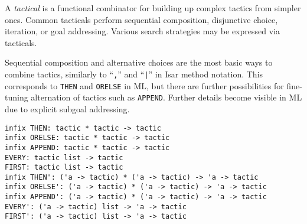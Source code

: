 \begin{isabellebody}
\begin{isamarkuptext}
\begin{description}
  \end{description}%
\end{isamarkuptext}%
\isamarkuptrue%
%
\endisatagmlref
{\isafoldmlref}%
%
\isadelimmlref
%
\endisadelimmlref
%
\isamarkuptrue%
%
\begin{isamarkuptext}%
A \emph{tactical} is a functional combinator for building up
  complex tactics from simpler ones.  Common tacticals perform
  sequential composition, disjunctive choice, iteration, or goal
  addressing.  Various search strategies may be expressed via
  tacticals.%
\end{isamarkuptext}%
\isamarkuptrue%
%
\isamarkuptrue%
%
\begin{isamarkuptext}%
Sequential composition and alternative choices are the most
  basic ways to combine tactics, similarly to ``\verb|,|'' and
  ``\verb||\verb,|,\verb||'' in Isar method notation.  This corresponds to
  \verb|THEN| and \verb|ORELSE| in ML, but there are further
  possibilities for fine-tuning alternation of tactics such as \verb|APPEND|.  Further details become visible in ML due to explicit
  subgoal addressing.%
\end{isamarkuptext}%
\isamarkuptrue%
%
\isadelimmlref
%
\endisadelimmlref
%
\isatagmlref
%
\begin{isamarkuptext}%
\begin{mldecls}
  \verb|infix THEN: tactic * tactic -> tactic| \\
  \verb|infix ORELSE: tactic * tactic -> tactic| \\
  \verb|infix APPEND: tactic * tactic -> tactic| \\
  \verb|EVERY: tactic list -> tactic| \\
  \verb|FIRST: tactic list -> tactic| \\[0.5ex]

  \verb|infix THEN': ('a -> tactic) * ('a -> tactic) -> 'a -> tactic| \\
  \verb|infix ORELSE': ('a -> tactic) * ('a -> tactic) -> 'a -> tactic| \\
  \verb|infix APPEND': ('a -> tactic) * ('a -> tactic) -> 'a -> tactic| \\
  \verb|EVERY': ('a -> tactic) list -> 'a -> tactic| \\
  \verb|FIRST': ('a -> tactic) list -> 'a -> tactic| \\
  \end{mldecls}


\end{isamarkuptext}
\end{isabellebody}
